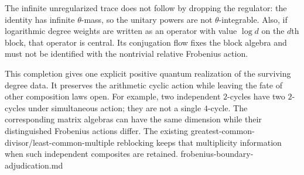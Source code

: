 The infinite unregularized trace does not follow by dropping the regulator:
the identity has infinite $\theta$-mass, so the unitary powers are not
$\theta$-integrable. Also, if logarithmic degree weights are written as
an operator with value $\log d$ on the $d$th block, that operator is central.
Its conjugation flow fixes the block algebra and must not be identified
with the nontrivial relative Frobenius action.

This completion gives one explicit positive quantum realization of the
surviving degree data. It preserves the arithmetic cyclic action while
leaving the fate of other composition laws open. For example, two
independent $2$-cycles have two $2$-cycles under simultaneous action;
they are not a single $4$-cycle. The corresponding matrix algebras can
have the same dimension while their distinguished Frobenius actions differ.
The existing greatest-common-divisor/least-common-multiple reblocking keeps
that multiplicity information when such independent composites are retained.
{frobenius-boundary-adjudication.md}
